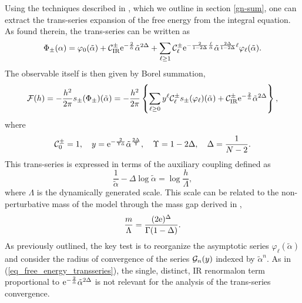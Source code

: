 \documentclass[a4paper,11pt]{article}
\theoremstyle{definition}
\newcommand{\CC}{{\cal C}}
\newcommand{\CF}{{\cal F}}
\newcommand{\CG}{{\cal G}}
\newcommand{\re}{{\rm e}}
\begin{document}
%
Using the techniques described in \cite{mmr-an}, which we outline in section \ref{gn-sum}, 
one can extract the trans-series expansion of the free energy from the integral equation.
As found therein, the trans-series can be written as
%
\begin{equation}
\Phi_\pm({\alpha}) = \varphi_0(\tilde{\alpha})+ \CC_{\text{IR}}^\pm \re^{-\frac{2}{\tilde{\alpha}}} \tilde{\alpha}^{2\Delta}
+ \sum_{\ell\geq 1} \CC_\ell^\pm \re^{-\frac{2}{1-2\Delta}\frac{\ell}{\tilde{\alpha}}}\tilde\alpha^{\frac{2\Delta}{1-2\Delta}\ell}\varphi_\ell(\tilde{\alpha}).
\label{free-energy-ts}
\end{equation}
%
The observable itself is then given by Borel summation,
%
\begin{equation}
\CF(h) = - \frac{h^2}{2\pi} s_\pm(\Phi_\pm)(\tilde{\alpha})= - \frac{h^2}{2\pi}\left\{\sum_{\ell\geq 0} y^\ell \CC_\ell^\pm s_\pm(\varphi_\ell)(\tilde{\alpha}) + \CC_{\text{IR}}^\pm \re^{-\frac{2}{\tilde{\alpha}}} \tilde{\alpha}^{2\Delta}\right\},\label{sum-kappa}
\end{equation}
%
where
%
\begin{equation}
\CC^\pm_0=1,\quad
y = \re^{-\frac{2}{\Upsilon\tilde{\alpha}}}\tilde\alpha^{\frac{2\Delta}{\Upsilon}},\quad \Upsilon = 1-2\Delta,\quad \Delta = \frac{1}{N-2}.
\end{equation}
%
This trans-series is expressed in terms of the auxiliary coupling defined as
%
\begin{equation}
\frac{1}{\tilde{\alpha}}-\Delta\log\tilde{\alpha}=\log\frac{h}{\Lambda},
\label{tilde-alpha-def}
\end{equation}
%
where $\Lambda$ is the dynamically generated scale. This scale can be related to the non-perturbative mass of the model through the mass gap derived in \cite{fnw1,fnw2},
\begin{equation}
\frac{m}{\Lambda} = \frac{(2\re)^\Delta}{\Gamma(1-\Delta)}.
\label{eq_mass_gap_GN}
\end{equation}
As previously outlined, the key test is to reorganize the asymptotic series $\varphi_{\ell}(\tilde{\alpha})$
and consider the radius of convergence of the series $\CG_n(y)$ indexed by $\tilde{\alpha}^n$.
As in (\ref{eq_free_energy_transseries}), the single, distinct, IR renormalon term proportional to
$\re^{-\frac{2}{\tilde{\alpha}}} \tilde{\alpha}^{2\Delta}$ is not relevant for the analysis of the trans-series convergence.
\end{document}
